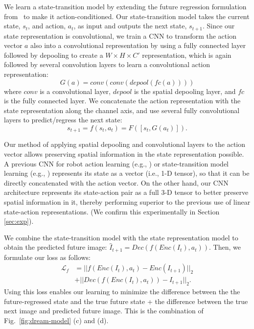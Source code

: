 \documentclass[letterpaper, 10 pt, conference]{ieeeconf}
\begin{document}
We learn a state-transition model by extending the future regression formulation from~\cite{lee2017learning} to make it action-conditioned. Our state-transition model takes the current state, $s_t$, and action, $a_t$, as input and outputs the next state, $s_{t+1}$. Since our state representation is convolutional, we train a CNN to transform the action vector $a$ also into a convolutional representation by using a fully connected layer followed by depooling to create a $W\times H\times C'$ representation, which is again followed by several convolution layers to learn a convolutional action representation:
\begin{equation}
    G(a) = conv(conv(depool(fc(a))))
\end{equation}
where $conv$ is a convolutional layer, $depool$ is the spatial depooling layer, and $fc$ is the fully connected layer.
We concatenate the action representation with the state representation along the channel axis, and use several fully convolutional layers to predict/regress the next state:
\begin{equation}
    s_{t+1} = f(s_t, a_t) = F([s_t, G(a_t)]).
\end{equation}

Our method of applying spatial depooling and convolutional layers to the action vector allows preserving spatial information in the state representation possible.
A previous CNN for robot action learning (e.g., \cite{finn2017deep}) or state-transition model learning (e.g., \cite{ha2018world}) represents its state as a vector (i.e., 1-D tensor), so that it can be directly concatenated with the action vector.
On the other hand, our CNN architecture represents its state-action pair as a full 3-D tensor to better preserve spatial information in it, thereby performing superior to the previous use of linear state-action representations. (We confirm this experimentally in Section \ref{sec:exp}).

We combine the state-transition model with the state representation model to obtain the predicted future image: $\hat{I}_{t+1} = Dec(f(Enc(I_t), a_t))$. 
Then, we formulate our loss as follows:
\begin{equation}
\begin{split}
        \mathcal{L}_{f} &= ||f(Enc(I_t), a_t) - Enc(I_{t+1})||_2 \\
        &+ ||Dec(f(Enc(I_t), a_t)) - I_{t+1}||_2.
\end{split}
\end{equation}
Using this loss enables our learning to minimize the difference between the the future-regressed state and the true future state + the difference between the true next image and predicted future image. This is the combination of Fig.~\ref{fig:dream-model} (c) and (d). 
\end{document}
